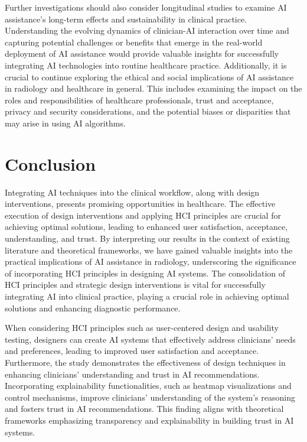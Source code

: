 Further investigations should also consider longitudinal studies to examine \ac{AI} assistance's long-term effects and sustainability in clinical practice.
Understanding the evolving dynamics of clinician-\ac{AI} interaction over time and capturing potential challenges or benefits that emerge in the real-world deployment of \ac{AI} assistance would provide valuable insights for successfully integrating \ac{AI} technologies into routine healthcare practice.
Additionally, it is crucial to continue exploring the ethical and social implications of \ac{AI} assistance in radiology and healthcare in general.
This includes examining the impact on the roles and responsibilities of healthcare professionals, trust and acceptance, privacy and security considerations, and the potential biases or disparities that may arise in using \ac{AI} algorithms.

\section{Conclusion}
\label{sec:chap005008}

Integrating \ac{AI} techniques into the clinical workflow, along with design interventions, presents promising opportunities in healthcare.
The effective execution of design interventions and applying \ac{HCI} principles are crucial for achieving optimal solutions, leading to enhanced user satisfaction, acceptance, understanding, and trust.
By interpreting our results in the context of existing literature and theoretical frameworks, we have gained valuable insights into the practical implications of \ac{AI} assistance in radiology, underscoring the significance of incorporating \ac{HCI} principles in designing \ac{AI} systems.
The consolidation of \ac{HCI} principles and strategic design interventions is vital for successfully integrating \ac{AI} into clinical practice, playing a crucial role in achieving optimal solutions and enhancing diagnostic performance.

When considering \ac{HCI} principles such as user-centered design and usability testing, designers can create \ac{AI} systems that effectively address clinicians' needs and preferences, leading to improved user satisfaction and acceptance.
Furthermore, the study demonstrates the effectiveness of design techniques in enhancing clinicians' understanding and trust in \ac{AI} recommendations.
Incorporating explainability functionalities, such as heatmap visualizations and control mechanisms, improve clinicians' understanding of the system's reasoning and fosters trust in \ac{AI} recommendations.
This finding aligns with theoretical frameworks emphasizing transparency and explainability in building trust in \ac{AI} systems.

